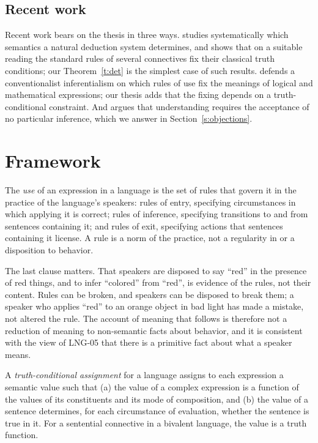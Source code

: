 \documentclass{situationist-preprint}
\begin{document}
\subsection{Recent work}

Recent work bears on the thesis in three ways. \citet{Garson2013} studies systematically which semantics a natural deduction system determines, and shows that on a suitable reading the standard rules of several connectives fix their classical truth conditions; our Theorem~\ref{t:det} is the simplest case of such results. \citet{Warren2020} defends a conventionalist inferentialism on which rules of use fix the meanings of logical and mathematical expressions; our thesis adds that the fixing depends on a truth-conditional constraint. And \citet{Williamson2007} argues that understanding requires the acceptance of no particular inference, which we answer in Section~\ref{s:objections}.

\section{Framework}\label{s:framework}

\begin{definition}[Use]\label{d:use}
The \emph{use} of an expression in a language is the set of rules that govern it in the practice of the language's speakers: rules of entry, specifying circumstances in which applying it is correct; rules of inference, specifying transitions to and from sentences containing it; and rules of exit, specifying actions that sentences containing it license. A rule is a norm of the practice, not a regularity in or a disposition to behavior.
\end{definition}

The last clause matters. That speakers are disposed to say \enquote{red} in the presence of red things, and to infer \enquote{colored} from \enquote{red}, is evidence of the rules, not their content. Rules can be broken, and speakers can be disposed to break them; a speaker who applies \enquote{red} to an orange object in bad light has made a mistake, not altered the rule. The account of meaning that follows is therefore not a reduction of meaning to non-semantic facts about behavior, and it is consistent with the view of LNG-05 that there is a primitive fact about what a speaker means.

\begin{definition}\label{d:assign}
A \emph{truth-conditional assignment} for a language assigns to each expression a semantic value such that (a) the value of a complex expression is a function of the values of its constituents and its mode of composition, and (b) the value of a sentence determines, for each circumstance of evaluation, whether the sentence is true in it. For a sentential connective in a bivalent language, the value is a truth function.
\end{definition}
\end{document}
